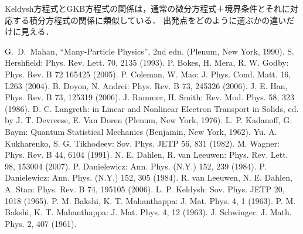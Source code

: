 \documentclass[a4paper,10pt]{jsarticle}
\begin{document}
Keldysh方程式とGKB方程式の関係は，通常の微分方程式＋境界条件とそれに対応する積分方程式の関係に類似している．
出発点をどのように選ぶかの違いだけに見える．










%

\begin{thebibliography}{99}
 G.~D.~Mahan, ``Many-Particle Physics'', 2nd edn. (Plenum, New York, 1990).
 S. Hershfield: Phys. Rev. Lett. 70, 2135 (1993).
 P. Bokes, H. Mera, R. W. Godby: Phys. Rev. B 72 165425 (2005).
 P. Coleman, W. Mao: J. Phys. Cond. Matt. 16, L263 (2004).
 B. Doyon, N. Andrei: Phys. Rev. B 73, 245326 (2006).
 J. E. Han, Phys. Rev. B 73, 125319 (2006).
 J. Rammer, H. Smith: Rev. Mod. Phys. 58, 323 (1986).
 D. C. Langreth: in Linear and Nonlinear Electron Transport in Solids, ed. by J. T. Devreese, E. Van Doren (Plenum, New York, 1976).
 L. P. Kadanoff, G. Baym: Quantum Statistical Mechanics (Benjamin, New York, 1962).
 Yu. A. Kukharenko, S. G. Tikhodeev: Sov. Phys. JETP 56, 831 (1982).
 M. Wagner: Phys. Rev. B 44, 6104 (1991).
 N. E. Dahlen, R. van Leeuwen: Phys. Rev. Lett. 98, 153004 (2007).
 P. Danielewicz: Ann. Phys. (N.Y.) 152, 239 (1984).
 P. Danielewicz: Ann. Phys. (N.Y.) 152, 305 (1984).
 R. van Leeuwen, N. E. Dahlen, A. Stan: Phys. Rev. B 74, 195105 (2006).
 L. P. Keldysh: Sov. Phys. JETP 20, 1018 (1965).
 P. M. Bakshi, K. T. Mahanthappa: J. Mat. Phys. 4, 1 (1963).
 P. M. Bakshi, K. T. Mahanthappa: J. Mat. Phys. 4, 12 (1963).
 J. Schwinger: J. Math. Phys. 2, 407 (1961).

\end{thebibliography}
\end{document}
